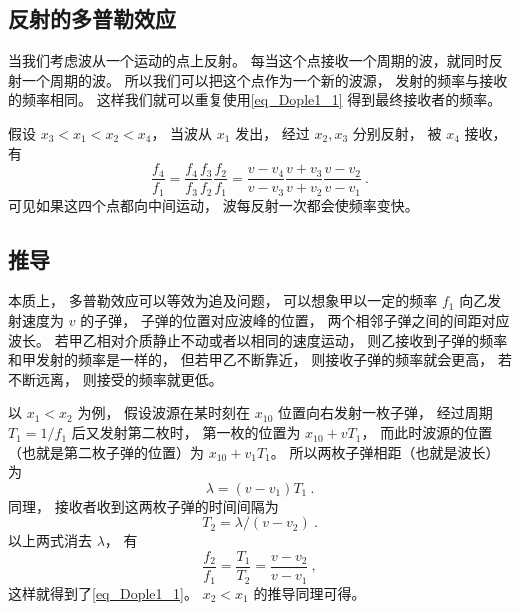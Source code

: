 \subsection{反射的多普勒效应}
当我们考虑波从一个运动的点上反射。 每当这个点接收一个周期的波，就同时反射一个周期的波。 所以我们可以把这个点作为一个新的波源， 发射的频率与接收的频率相同。 这样我们就可以重复使用\autoref{eq_Dople1_1} 得到最终接收者的频率。

\begin{example}{}
假设 $x_3 < x_1 < x_2 < x_4$， 当波从 $x_1$ 发出， 经过 $x_2, x_3$ 分别反射， 被 $x_4$ 接收， 有
\begin{equation}
\frac{f_4}{f_1} = \frac{f_4}{f_3}\frac{f_3}{f_2}\frac{f_2}{f_1}
= \frac{v - v_4}{v - v_3}\frac{v + v_3}{v + v_2}\frac{v - v_2}{v - v_1}~.
\end{equation}
可见如果这四个点都向中间运动， 波每反射一次都会使频率变快。
\end{example}

\subsection{推导}
本质上， 多普勒效应可以等效为追及问题， 可以想象甲以一定的频率 $f_1$ 向乙发射速度为 $v$ 的子弹， 子弹的位置对应波峰的位置， 两个相邻子弹之间的间距对应波长。 若甲乙相对介质静止不动或者以相同的速度运动， 则乙接收到子弹的频率和甲发射的频率是一样的， 但若甲乙不断靠近， 则接收子弹的频率就会更高， 若不断远离， 则接受的频率就更低。

以 $x_1 < x_2$ 为例， 假设波源在某时刻在 $x_{10}$ 位置向右发射一枚子弹， 经过周期 $T_1 = 1/f_1$ 后又发射第二枚时， 第一枚的位置为 $x_{10} + vT_1$， 而此时波源的位置（也就是第二枚子弹的位置）为 $x_{10} + v_1 T_1$。 所以两枚子弹相距（也就是波长）为
\begin{equation}
\lambda = (v - v_1)T_1~.
\end{equation}
同理， 接收者收到这两枚子弹的时间间隔为
\begin{equation}
T_2 = \lambda/ (v - v_2)~.
\end{equation}
以上两式消去 $\lambda$， 有
\begin{equation}
\frac{f_2}{f_1} = \frac{T_1}{T_2} = \frac{v - v_2}{v - v_1}~,
\end{equation}
这样就得到了\autoref{eq_Dople1_1}。 $x_2 < x_1$ 的推导同理可得。
